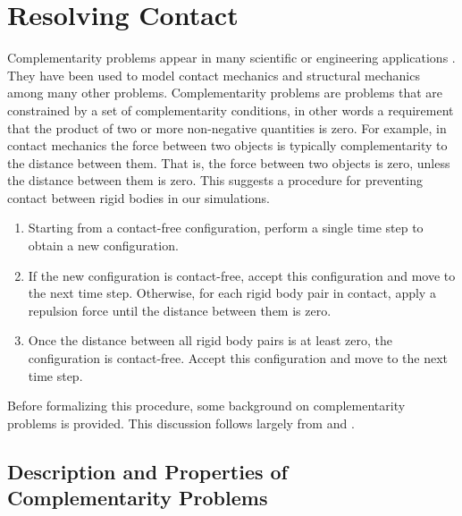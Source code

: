 \chapter{Resolving Contact}\label{chap:repulsion}

Complementarity problems appear in many scientific or engineering applications \cite{Ferris1995}. They have been used to model contact mechanics \cite{Bender2012, Stewart1996,Anitescu1997} and structural mechanics \cite{Maier1968} among many other problems. Complementarity problems are problems that are constrained by a set of complementarity conditions, in other words a requirement that the product of two or more non-negative quantities is zero. For example, in contact mechanics the force between two objects is typically complementarity to the distance between them. That is, the force between two objects is zero, unless the distance between them is zero. This suggests a procedure for preventing contact between rigid bodies in our simulations. 
\begin{enumerate}
	\item Starting from a contact-free configuration, perform a single time step to obtain a new configuration.
	\item If the new configuration is contact-free, accept this configuration and move to the next time step. Otherwise, for each rigid body pair in contact, apply a repulsion force until the distance between them is zero.
	\item Once the distance between all rigid body pairs is at least zero, the configuration is contact-free. Accept this configuration and move to the next time step.
\end{enumerate}

Before formalizing this procedure, some background on complementarity problems is provided. This discussion follows largely from \cite{Billups2000} and \cite{Erleben2013}.

\section{Description and Properties of Complementarity Problems}

